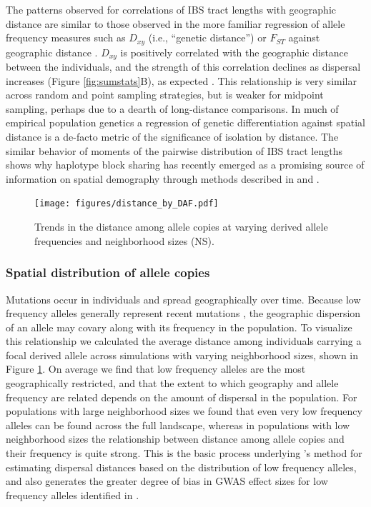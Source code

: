 \documentclass[10pt,twoside,lineno,hidelinks]{preprint}
\begin{document}
The patterns observed for correlations of IBS tract lengths with geographic distance are similar to those observed in the more familiar regression of allele frequency measures such as $D_{xy}$ (i.e., ``genetic distance'') or $F_{ST}$ against geographic distance \citep{Rousset1997}. $D_{xy}$ is positively correlated with the geographic distance between the individuals, and the strength of this correlation declines as dispersal increases (Figure \ref{fig:sumstats}B), as expected \citep{Wright1943,Rousset1997}. This relationship is very similar across random and point sampling strategies, but is weaker for midpoint sampling, perhaps due to a dearth of long-distance comparisons. In much of empirical population genetics a regression of genetic differentiation against spatial distance is a de-facto metric of the significance of isolation by distance. The similar behavior of moments of the pairwise distribution of IBS tract lengths shows why haplotype block sharing has recently emerged as a promising source of information on spatial demography through methods described in \citet{Ringbauer2017} and \citet{Baharian2016}. 

\begin{figure}[p]
\centering
\texttt{[image: figures/distance\_by\_DAF.pdf]}
\caption{Trends in the distance among allele copies at varying derived allele frequencies and neighborhood sizes (NS).}
\label{fig:dafdists}
\end{figure}

\subsubsection{Spatial distribution of allele copies}

Mutations occur in individuals and spread geographically over time. Because low frequency alleles generally represent recent mutations \citep{sawyer1977past, griffiths1999ages}, the geographic dispersion of an allele may covary along with its frequency in the population. To visualize this relationship we calculated the average distance among individuals carrying a focal derived allele across simulations with varying neighborhood sizes, shown in Figure \ref{fig:dafdists}. On average we find that low frequency alleles are the most geographically restricted, and that the extent to which geography and allele frequency are related depends on the amount of dispersal in the population. For populations with large neighborhood sizes we found that even very low frequency alleles can be found across the full landscape, whereas in populations with low neighborhood sizes the relationship between distance among allele copies and their frequency is quite strong. This is the basic process underlying \citeauthor{Novembre2009}'s \citeyearpar{Novembre2009} method for estimating dispersal distances based on the distribution of low frequency alleles, and also generates the greater degree of bias in GWAS effect sizes for low frequency alleles identified in \citet{Mathieson2012}.
\end{document}
